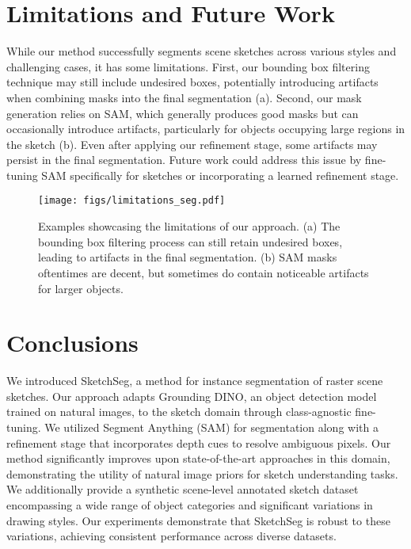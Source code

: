 \section{Limitations and Future Work}
While our method successfully segments scene sketches across various styles and challenging cases, it has some limitations.
First, our bounding box filtering technique may still include undesired boxes, potentially introducing artifacts when combining masks into the final segmentation (a).
Second, our mask generation relies on SAM, which generally produces good masks but can occasionally introduce artifacts, particularly for objects occupying large regions in the sketch (b). Even after applying our refinement stage, some artifacts may persist in the final segmentation. Future work could address this issue by fine-tuning SAM specifically for sketches or incorporating a learned refinement stage.



\begin{figure}
    \texttt{[image: figs/limitations\_seg.pdf]}
    \caption{Examples showcasing the limitations of our approach. (a) The bounding box filtering process can still retain undesired boxes, leading to artifacts in the final segmentation. (b) SAM masks oftentimes are decent, but sometimes do contain noticeable artifacts for larger objects. }
    \label{fig:limitations}
\end{figure}

 

\section{Conclusions}
We introduced SketchSeg, a method for instance segmentation of raster scene sketches. Our approach adapts Grounding DINO, an object detection model trained on natural images, to the sketch domain through class-agnostic fine-tuning. We utilized Segment Anything (SAM) for segmentation along with a refinement stage that incorporates depth cues to resolve ambiguous pixels.
Our method significantly improves upon state-of-the-art approaches in this domain, demonstrating the utility of natural image priors for sketch understanding tasks. We additionally provide a synthetic scene-level annotated sketch dataset encompassing a wide range of object categories and significant variations in drawing styles. Our experiments demonstrate that SketchSeg is robust to these variations, achieving consistent performance across diverse datasets.

